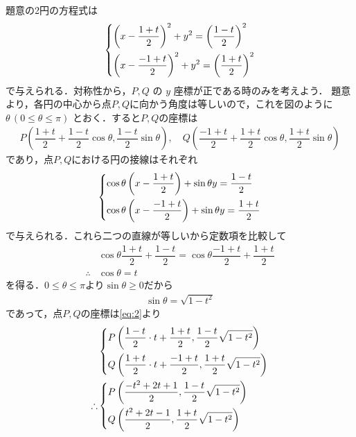 \documentclass[../../main.tex]{subfiles}
\begin{document}
題意の2円の方程式は
\begin{align}
  \begin{dcases}
    \left(x - \dfrac{1+t}{2}\right)^2 + y^2 = \left(\dfrac{1-t}{2}\right)^2 \\
    \left(x - \dfrac{-1+t}{2}\right)^2 + y^2 = \left(\dfrac{1+t}{2}\right)^2
  \end{dcases}
  \label{eq:1}
\end{align}
で与えられる．対称性から，$P, Q$ の $y$ 座標が正である時のみを考えよう．
題意より，各円の中心から点$P, Q$に向かう角度は等しいので，これを図のように $\theta\, (0\le\theta\le \pi)$ とおく．すると$P,Q$の座標は
\begin{align}
  P\left(\dfrac{1+t}{2}+\dfrac{1-t}{2}\cos\theta, \dfrac{1-t}{2}\sin\theta\right),
  \quad
  Q\left(\dfrac{-1+t}{2}+\dfrac{1+t}{2}\cos\theta, \dfrac{1+t}{2}\sin\theta\right) \label{eq:2}
\end{align}
であり，点$P, Q$における円の接線はそれぞれ
\begin{align}
  \begin{dcases}
    \cos\theta\left(x - \dfrac{1+t}{2}\right) + \sin\theta y = \dfrac{1-t}{2} \\
    \cos\theta\left(x - \dfrac{-1+t}{2}\right) + \sin\theta y = \dfrac{1+t}{2}
  \end{dcases}
\end{align}
で与えられる．これら二つの直線が等しいから定数項を比較して
\begin{align}
  & \cos\theta \dfrac{1+t}{2} + \dfrac{1-t}{2} = \cos\theta \dfrac{-1+t}{2} + \dfrac{1+t}{2} \\
  \therefore
  & \cos\theta = t \label{eq:3}
\end{align}
を得る．$0\le\theta\le\pi$より$\sin\theta \ge 0$だから
\begin{align}
  \sin\theta = \sqrt{1-t^2}
\end{align}
であって，点$P, Q$の座標は\cref{eq:2}より
\begin{align}
  &
  \begin{dcases}
    P\left(\dfrac{1-t}{2} \cdot t + \dfrac{1+t}{2}, \dfrac{1-t}{2}\sqrt{1-t^2}\right) \\
    Q\left(\dfrac{1+t}{2} \cdot t + \dfrac{-1+t}{2}, \dfrac{1+t}{2}\sqrt{1-t^2}\right)
  \end{dcases} \\
  \therefore
  &
  \begin{dcases}
    P\left(\dfrac{-t^2+2t+1}{2}, \dfrac{1-t}{2}\sqrt{1-t^2}\right) \\
    Q\left(\dfrac{t^2+2t-1}{2}, \dfrac{1+t}{2}\sqrt{1-t^2}\right)
  \end{dcases}
\end{align}
\end{document}
